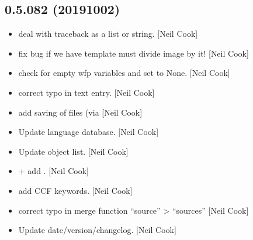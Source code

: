 \documentclass[a4paper,10pt,english]{report}
\begin{document}
\subsection{0.5.082 (2019\sphinxhyphen{}10\sphinxhyphen{}02)}
\label{\detokenize{misc/changelog:id79}}\begin{itemize}
\item {} 
 \sphinxhyphen{} deal with traceback as a list or
string. {[}Neil Cook{]}

\item {} 
 \sphinxhyphen{} fix bug if we have template must divide
image by it! {[}Neil Cook{]}

\item {} 
 \sphinxhyphen{} check for empty wfp variables and set to None.
{[}Neil Cook{]}

\item {} 
 \sphinxhyphen{} correct typo in text entry.
{[}Neil Cook{]}

\item {} 
 \sphinxhyphen{} add saving of files (via 
{[}Neil Cook{]}

\item {} 
Update language database. {[}Neil Cook{]}

\item {} 
Update object list. {[}Neil Cook{]}

\item {} 
 +  \sphinxhyphen{}
add . {[}Neil Cook{]}

\item {} 
 \sphinxhyphen{} add CCF keywords. {[}Neil Cook{]}

\item {} 
 \sphinxhyphen{} correct typo in merge function
“source” \textendash{}\textgreater{} “sources” {[}Neil Cook{]}

\item {} 
Update date/version/changelog. {[}Neil Cook{]}

\end{itemize}
\end{document}
